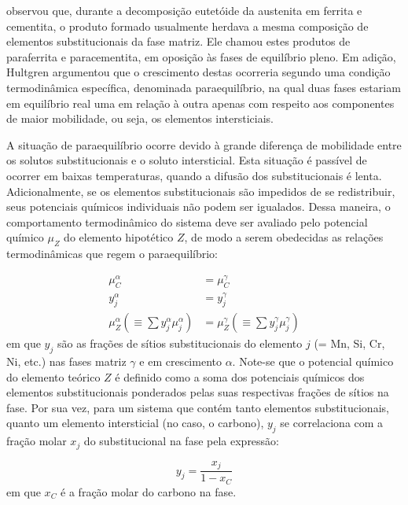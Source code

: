 
 observou que, durante a decomposição eutetóide da austenita em ferrita e cementita, o produto formado usualmente herdava a mesma composição de elementos substitucionais da fase matriz. Ele chamou estes produtos de paraferrita e paracementita, em oposição às fases de equilíbrio pleno. Em adição, Hultgren argumentou que o crescimento destas  ocorreria segundo uma condição termodinâmica específica, denominada paraequilíbrio, na qual duas fases estariam em equilíbrio real uma em relação à outra apenas com respeito aos componentes de maior mobilidade, ou seja, os elementos intersticiais.

A situação de paraequilíbrio ocorre devido à grande diferença de mobilidade entre os solutos substitucionais e o soluto intersticial. Esta situação é passível de ocorrer em baixas temperaturas, quando a difusão dos substitucionais é lenta\cite{Hillert1953}. Adicionalmente, se os elementos substitucionais são impedidos de se redistribuir, seus potenciais químicos individuais não podem ser igualados. Dessa maneira, o comportamento termodinâmico do sistema deve ser avaliado pelo potencial químico $\mu_Z$ do elemento hipotético $Z$\cite{Ghosh2001}, de modo a serem obedecidas as relações termodinâmicas que regem o paraequilíbrio:

\begin{subequations}
	\begin{align}
		\mu_C^\alpha &= \mu_C^\gamma \label{eq:potQuimC}\\
		y_j^\alpha &= y_j^\gamma \label{eq:fracSitios}\\
		\mu_Z^\alpha \left ( \equiv \sum y_j^\alpha \mu_j^\alpha \right) &= \mu_Z^\gamma \left ( \equiv \sum y_j^\gamma \mu_j^\gamma \right ) \label{eq:potQuimZ}
	\end{align}
\end{subequations}
%
em que $y_j$ são as frações de sítios substitucionais do elemento $j$ (= Mn, Si, Cr, Ni, etc.) nas fases matriz $\gamma$ e em crescimento $\alpha$. Note-se que o potencial químico do elemento teórico $Z$ é definido como a soma dos potenciais químicos dos elementos substitucionais ponderados pelas suas respectivas frações de sítios na fase. Por sua vez, para um sistema que contém tanto elementos substitucionais, quanto um elemento intersticial (no caso, o carbono), $y_j$ se correlaciona com a fração molar $x_j$ do substitucional na fase pela expressão:

\begin{equation}
	y_j = \frac{x_j}{1 - x_C}
\end{equation}
%
em que $x_C$ é a fração molar do carbono na fase.

